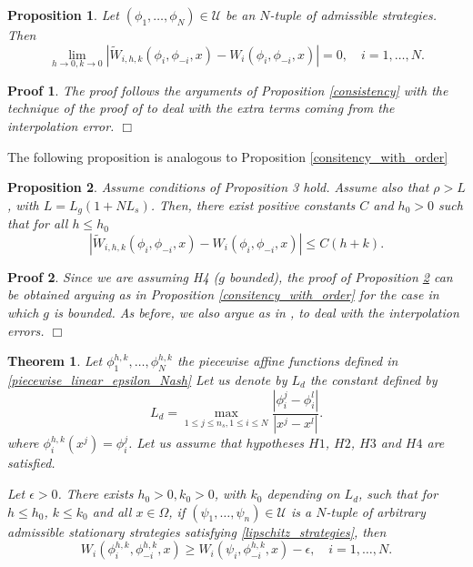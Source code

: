 \documentclass[12pt]{article}
\newtheorem{theorem}{Theorem}
\newtheorem{proposition}{Proposition}
\newtheorem{Proof}{Proof}
\newenvironment{proof}{\begin{Proof}\rm}{\hfill $\Box$ \end{Proof}}
\begin{document}
\begin{proposition}\label{consistency_fully}
Let  $(\phi_1,\dots,\phi_N)\in\mathcal{U}$ be an $N$-tuple of admissible strategies.  Then
\begin{equation*}
\lim_{h\rightarrow 0, k\rightarrow 0} \left|\widetilde W_{i,h,k}(\phi_{i},\phi_{-i},x)- W_i(\phi_{i},\phi_{-i},x)\right|=0,
\quad i=1,\dots,N.
\end{equation*}
\end{proposition}
\begin{proof}
The proof follows the arguments of Proposition \ref{consistency}  with the technique of the proof of \cite[Lemma 1]{Javier_yo}
to deal with the extra terms coming from the interpolation error.
\end{proof}
The following proposition is analogous to Proposition \ref {consitency_with_order}
\begin{proposition}\label{consitency_with_order_fully}
Assume conditions of Proposition 3 hold.  Assume also that {$\rho> L$}, with $L=L_g(1+NL_s)$.  Then, there exist
positive constants $C$ and $h_0>0$ such that for all $h\le h_0$
\begin{equation*}
\left|\widetilde W_{i,h,k}(\phi_{i},\phi_{-i},x)- W_i(\phi_{i},\phi_{-i},x)\right|\le C (h+k).
\end{equation*}
\end{proposition}
\begin{proof}
Since we are assuming H4 ($g$ bounded), the proof of Proposition \ref{consitency_with_order_fully} can be
obtained arguing as in Proposition \ref{consitency_with_order} for the case in which $g$ is bounded. As before, we also argue as in
\cite[Lemma 2]{Javier_yo}, to deal with the interpolation errors.
\end{proof}
\begin{theorem}\label{epsilon-Nash_fully}
Let $\phi_1^{h,k}, \dots,\phi_N^{h,k}$ the piecewise affine functions defined in \eqref{piecewise_linear_epsilon_Nash}
Let us denote by $L_d$ the constant defined by
\begin{equation}\label{lip_dis}
L_d=\max_{1\le j\le n_s,1\le i\le N}\frac{| \phi_i^j-\phi_i^l|} {|x^j-x^l|}.
\end{equation}
where $\phi_i^{h,k}(x^j)=\phi_i^j$.
Let us assume that hypotheses $H1$, $H2$, $H3$ and $H4$ are satisfied.

Let  $\epsilon>0$. There exists $h_0>0, k_0>0$,  with $k_0$ depending on $L_d$, such that for $h\le h_0$, $k\le k_0$   and all $x\in\Omega$, if $(\psi_1,\dots,\psi_n)\in\mathcal{U}$ is a $N$-tuple of arbitrary admissible stationary strategies satisfying \eqref{lipschitz_strategies}, then
\begin{equation}\label{final_bound}
W_i(\phi_i^{h,k},\phi_{-i}^{h,k},x)\ge W_i(\psi_i,\phi_{-i}^{h,k},x)-\epsilon,\quad i=1,\dots, N.
\end{equation}
\end{theorem}
\end{document}
